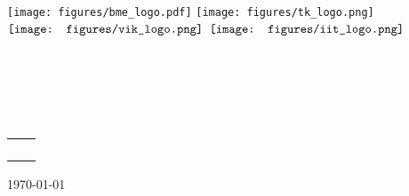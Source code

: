 \hypersetup{pageanchor=false}

\begin{titlepage}
\begin{center}
\texttt{[image: figures/bme\_logo.pdf]}
\hspace{5mm}
\texttt{[image: figures/tk\_logo.png]}
\\[0.3cm]
$\vcenter{\hbox{\texttt{[image: figures/vik\_logo.png]}}}$
\hspace{10mm}
$\vcenter{\hbox{\texttt{[image: figures/iit\_logo.png]}}}$
\\[0.4cm]

\textbf{\bme}\\
\textmd{\vik}\\
\textmd{\viktanszek}\\[4cm]

\vspace{0.4cm}
{\huge \bfseries \vikcim}\\[0.8cm]
\vspace{0.5cm}
\textsc{\Large \vikdoktipus}\\[4cm]

{
	\renewcommand{\arraystretch}{0.85}
	\begin{tabular}{cc}
	 \makebox[7cm]{\emph{\keszitette}} & \makebox[7cm]{\emph{\konzulens}} \\ \noalign{\smallskip}
	 \makebox[7cm]{\szerzo} & \makebox[7cm]{\vikkonzulensA} \\
	  & \makebox[7cm]{\vikkonzulensB} \\
	  & \makebox[7cm]{\vikkonzulensC} \\
	\end{tabular}
}

\vfill
{\large \today}
\end{center}
\end{titlepage}
\hypersetup{pageanchor=false}
